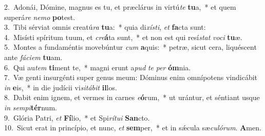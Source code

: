 {2.~}Adonái, Dómine, magnus es tu, et præclárus in virtú\textit{te} \textbf{tu}a,~* et quem superá\textit{re} \textit{ne}\textit{mo} \textbf{po}test.\\
{3.~}Tibi sérviat omnis creatú\textit{ra} \textbf{tu}a:~* quia di\textit{xí}\textit{sti}, \textit{et} \textbf{fa}cta sunt:\\
{4.~}Misísti spíritum tuum, et \textit{cre}\textbf{á}ta sunt,~* et non est qui resí\textit{stat} \textit{vo}\textit{ci} \textbf{tu}æ.\\
{5.~}Montes a fundaméntis movebúntur \textit{cum} \textbf{a}quis:~* petræ, sicut cera, liquéscent ante \textit{fá}\textit{ci}\textit{em} \textbf{tu}am.\\
{6.~}Qui au\textit{tem} \textbf{ti}ment te,~* magni erunt a\textit{pud} \textit{te} \textit{per} \textbf{óm}nia.\\
{7.~}Væ genti insurgénti super genus meum: Dóminus enim omnípotens vindicábit \textit{in} \textbf{e}is,~* in die judícii vi\textit{si}\textit{tá}\textit{bit} \textbf{il}los.\\
{8.~}Dabit enim ignem, et vermes in carnes \textit{e}\textbf{ó}rum,~* ut urántur, et séntiant usque \textit{in} \textit{sem}\textit{pi}\textbf{tér}num.\\
{9.~}Glória Patri, \textit{et} \textbf{Fí}lio,~* et Spi\textit{rí}\textit{tu}\textit{i} \textbf{San}cto.\\
{10.~}Sicut erat in princípio, et nunc, \textit{et} \textbf{sem}per,~* et in sǽcula sæ\textit{cu}\textit{ló}\textit{rum}. \textbf{A}men.\\
